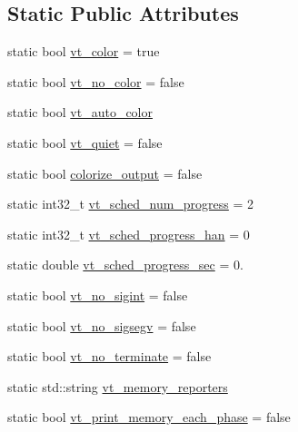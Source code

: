 \subsection*{Static Public Attributes}
\begin{DoxyCompactItemize}
\item 
static bool \hyperlink{structvt_1_1arguments_1_1_arg_config_aa1298b5dcba576da489b54d26ae09de9}{vt\+\_\+color} = true
\item 
static bool \hyperlink{structvt_1_1arguments_1_1_arg_config_a7b6f18a60a05a84f99852904088f499d}{vt\+\_\+no\+\_\+color} = false
\item 
static bool \hyperlink{structvt_1_1arguments_1_1_arg_config_a5fe8777bbb7c249f7549398cea5aacdc}{vt\+\_\+auto\+\_\+color}
\item 
static bool \hyperlink{structvt_1_1arguments_1_1_arg_config_ace1478026a995a0ffd075827ce9f985c}{vt\+\_\+quiet} = false
\item 
static bool \hyperlink{structvt_1_1arguments_1_1_arg_config_a98e91ff747e85c52700f8ddb410fabb7}{colorize\+\_\+output} = false
\item 
static int32\+\_\+t \hyperlink{structvt_1_1arguments_1_1_arg_config_af4959df3d7d424015e14861cb43362af}{vt\+\_\+sched\+\_\+num\+\_\+progress} = 2
\item 
static int32\+\_\+t \hyperlink{structvt_1_1arguments_1_1_arg_config_ab021f71bb3d93628d874b51b94f8364c}{vt\+\_\+sched\+\_\+progress\+\_\+han} = 0
\item 
static double \hyperlink{structvt_1_1arguments_1_1_arg_config_a247f2f58ded7742c4b433646a53139ac}{vt\+\_\+sched\+\_\+progress\+\_\+sec} = 0.
\item 
static bool \hyperlink{structvt_1_1arguments_1_1_arg_config_ad8eeabd4e783774894d21055fc3986b3}{vt\+\_\+no\+\_\+sigint} = false
\item 
static bool \hyperlink{structvt_1_1arguments_1_1_arg_config_ae657e6a5c890a0822958ccb6ff670159}{vt\+\_\+no\+\_\+sigsegv} = false
\item 
static bool \hyperlink{structvt_1_1arguments_1_1_arg_config_ae2fe8d151f382e70483f33c24c4fae2e}{vt\+\_\+no\+\_\+terminate} = false
\item 
static std\+::string \hyperlink{structvt_1_1arguments_1_1_arg_config_aecb7f6c124ad6325371d386138b2d496}{vt\+\_\+memory\+\_\+reporters}
\item 
static bool \hyperlink{structvt_1_1arguments_1_1_arg_config_ad0476800d4308be64b96754a5a12f4a0}{vt\+\_\+print\+\_\+memory\+\_\+each\+\_\+phase} = false
\item 

\end{DoxyCompactItemize}
